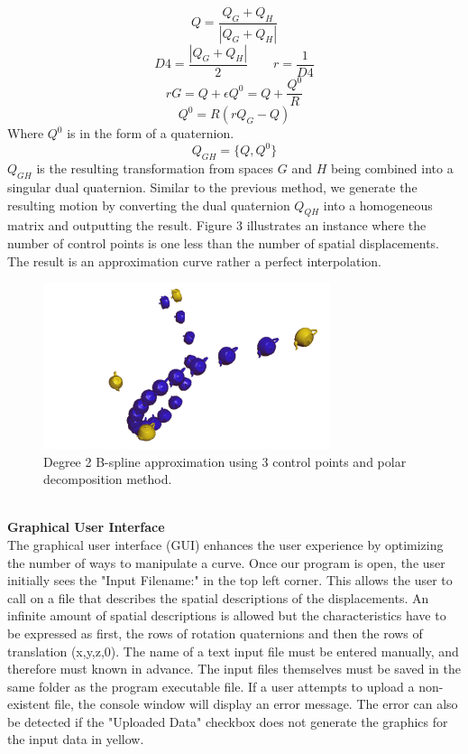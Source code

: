 \documentclass[11pt]{article}
\begin{document}
$$ Q = \frac{Q_G + Q_H}{|Q_G + Q_H|} $$
$$ D4 = \frac{|Q_G + Q_H|}{2} \qquad r = \frac{1}{D4} $$
$$ rG=Q+\epsilon Q^0=Q+\frac{Q^0}{R}$$
$$ Q^0 = R(rQ_G-Q)$$
Where $Q^0$ is in the form of a quaternion.
$$ Q_{GH} = \{Q,Q^0\} $$
$Q_{GH}$ is the resulting transformation from spaces $G$ and $H$ being combined into a singular dual quaternion.
Similar to the previous method, we generate the resulting motion by converting the dual quaternion $Q_{QH}$ into a homogeneous matrix and outputting the result. Figure 3 illustrates an instance where the number of control points is one less than the number of spatial displacements. The result is an approximation curve rather a perfect interpolation.
\\
\begin{figure}[h]
  \centering
  \includegraphics[width=0.75\textwidth]{Polar_Approx.png}
  \caption{Degree 2 B-spline approximation using 3 control points and polar decomposition method.}
  \label{Figure: 3}
\end{figure}
\\
\textbf{\large{Graphical User Interface}}
\\
The graphical user interface (GUI) enhances the user experience by optimizing the number of ways to manipulate a curve. Once our program is open, the user initially sees the "Input Filename:" in the top left corner. This allows the user to call on a file that describes the spatial descriptions of the displacements. An infinite amount of spatial descriptions is allowed but the characteristics have to be expressed as first, the rows of rotation quaternions and then the rows of translation (x,y,z,0). The name of a text input file must be entered manually, and therefore must known in advance. The input files themselves must be saved in the same folder as the program executable file. If a user attempts to upload a non-existent file, the console window will display an error message. The error can also be detected if the "Uploaded Data" checkbox does not generate the graphics for the input data in yellow.
\end{document}
